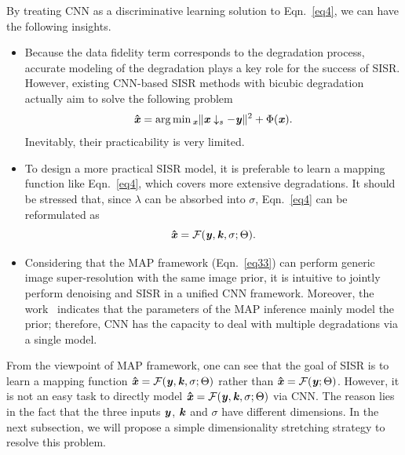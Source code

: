 \documentclass[10pt,twocolumn,letterpaper]{article}
\begin{document}
By treating CNN as a discriminative learning solution to Eqn.~\eqref{eq4}, we can have the following insights.
\begin{itemize}[fullwidth]
  \item Because the data fidelity term corresponds to the degradation process, accurate modeling of the degradation plays a key role for the success of SISR. However, existing CNN-based SISR methods with bicubic degradation actually aim to solve the following problem
  \begin{equation}\label{eq5}
 \boldsymbol{\hat{\textbf{\emph{x}}}} = \mathop{\arg\min}\displaystyle_{\textbf{\emph{x}}}\|\textbf{\emph{x}}\downarrow_s-\textbf{\emph{y}}\|^2  + \Phi(\textbf{\emph{x}}).
\end{equation}
Inevitably, their practicability is very limited.

\item To design a more practical SISR model, it is preferable to learn a mapping function like Eqn.~\eqref{eq4}, which covers more extensive degradations. It should be stressed that, since $\lambda$ can be absorbed into $\sigma$, Eqn.~\eqref{eq4} can be reformulated as
\begin{equation}\label{eq6}
 \boldsymbol{\hat{\textbf{\emph{x}}}} = \mathcal{F}(\textbf{\emph{y}}, \textbf{\emph{k}},\sigma; \Theta).
\end{equation}

\item Considering that the MAP framework (Eqn.~\eqref{eq33}) can perform generic image super-resolution with the same image prior, it is intuitive to jointly perform denoising and SISR in a unified CNN framework. Moreover, the work~\cite{zhang2017beyond} indicates that the parameters of the MAP inference mainly model the prior; therefore, CNN has the capacity to deal with multiple degradations via a single model.
\end{itemize}






From the viewpoint of MAP framework, one can see that the goal of SISR is to learn a mapping function
$\boldsymbol{\hat{\textbf{\emph{x}}}} = \mathcal{F}(\textbf{\emph{y}}, \textbf{\emph{k}},\sigma; \Theta)$ rather than $\boldsymbol{\hat{\textbf{\emph{x}}}} = \mathcal{F}(\textbf{\emph{y}}; \Theta)$.
However, it is not an easy task to directly model $\boldsymbol{\hat{\textbf{\emph{x}}}} = \mathcal{F}(\textbf{\emph{y}}, \textbf{\emph{k}},\sigma; \Theta)$ via CNN.
The reason lies in the fact that the three inputs $\textbf{\emph{y}}$, $\textbf{\emph{k}}$ and $\sigma$ have different dimensions.
In the next subsection, we will propose a simple dimensionality stretching strategy to resolve this problem.
\end{document}
